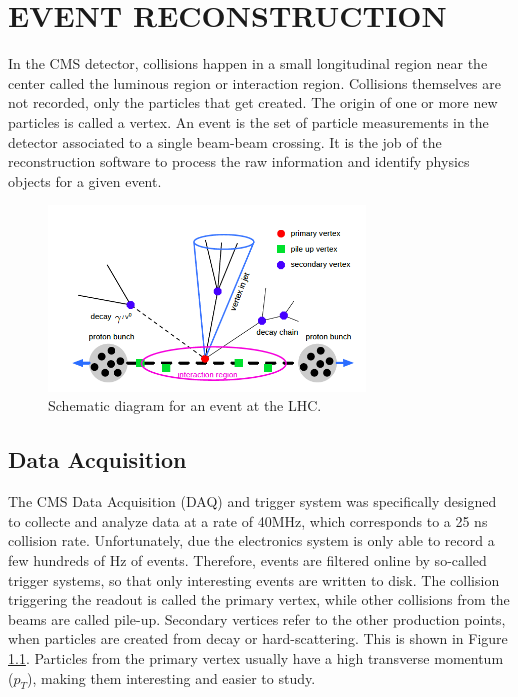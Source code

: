 %
%
%
%



\chapter{EVENT RECONSTRUCTION \label{cha:eventreco}}
In the CMS detector, collisions happen in a small longitudinal region near the center called the luminous region or interaction region. Collisions themselves are not recorded, only the particles that get created. The origin of one or more new particles is called a vertex. An event is the set of particle measurements in the detector associated to a single beam-beam crossing. It is the job of the reconstruction software to process the raw information and identify physics objects for a given event.

 \begin{figure}[H]
 	\centering
 	\includegraphics[width=0.75\textwidth]{figures/eventvertex.png}
 	\singlespace
 	\caption{Schematic diagram for an event at the LHC.}
 	\label{fig:vertex}
 \end{figure}


\section{Data Acquisition}
The CMS Data Acquisition (DAQ) and trigger system was specifically designed to collecte and analyze data at a rate of 40MHz, which corresponds to a 25 ns collision rate. Unfortunately, due the electronics system is only able to record a few hundreds of Hz of events. Therefore, events are filtered online by so-called trigger systems, so that only interesting events are written to disk. The collision triggering the readout is called the primary vertex, while other collisions from the beams are called pile-up. Secondary vertices refer to the other production points, when particles are created from decay or hard-scattering. This is shown in Figure \ref{fig:vertex}. Particles from the primary vertex usually have a high transverse momentum ($p_{T}$), making them interesting and easier to study.

